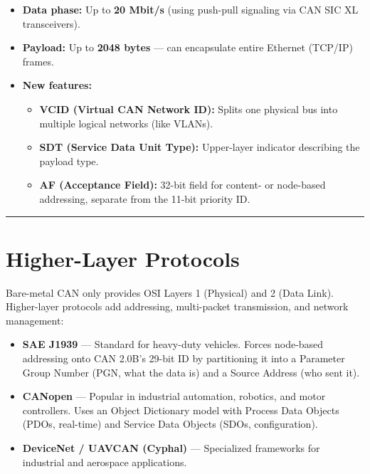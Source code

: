 \documentclass[12pt,a4paper,oneside]{report}
\providecommand{\tightlist}{\setlength{\itemsep}{0pt}\setlength{\parskip}{0pt}}
\begin{document}
\begin{itemize}
\tightlist
\item
  \textbf{Data phase:} Up to \textbf{20 Mbit/s} (using push-pull signaling via
  CAN SIC XL transceivers).
\item
  \textbf{Payload:} Up to \textbf{2048 bytes} --- can encapsulate entire
  Ethernet (TCP/IP) frames.
\item
  \textbf{New features:}

  \begin{itemize}
  \tightlist
  \item
    \textbf{VCID (Virtual CAN Network ID):} Splits one physical bus into
    multiple logical networks (like VLANs).
  \item
    \textbf{SDT (Service Data Unit Type):} Upper-layer indicator describing the
    payload type.
  \item
    \textbf{AF (Acceptance Field):} 32-bit field for content- or node-based
    addressing, separate from the 11-bit priority ID.
  \end{itemize}
\end{itemize}

\begin{center}\rule{0.5\linewidth}{0.5pt}\end{center}

\section{Higher-Layer Protocols}\label{higher-layer-protocols}

Bare-metal CAN only provides OSI Layers 1 (Physical) and 2 (Data Link).
Higher-layer protocols add addressing, multi-packet transmission, and network
management:

\begin{itemize}
\tightlist
\item
  \textbf{SAE J1939} --- Standard for heavy-duty vehicles. Forces node-based
  addressing onto CAN 2.0B's 29-bit ID by partitioning it into a Parameter Group
  Number (PGN, what the data is) and a Source Address (who sent it).
\item
  \textbf{CANopen} --- Popular in industrial automation, robotics, and motor
  controllers. Uses an Object Dictionary model with Process Data Objects (PDOs,
  real-time) and Service Data Objects (SDOs, configuration).
\item
  \textbf{DeviceNet / UAVCAN (Cyphal)} --- Specialized frameworks for industrial
  and aerospace applications.
\end{itemize}
\end{document}
